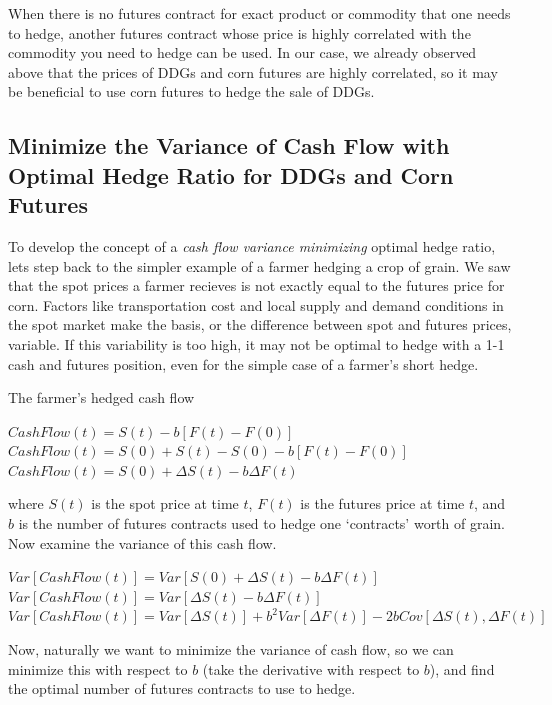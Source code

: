 \documentclass[
]{book}
\begin{document}
When there is no futures contract for exact product or commodity that one needs to hedge, another futures contract whose price is highly correlated with the commodity you need to hedge can be used. In our case, we already observed above that the prices of DDGs and corn futures are highly correlated, so it may be beneficial to use corn futures to hedge the sale of DDGs.

\hypertarget{minimize-the-variance-of-cash-flow-with-optimal-hedge-ratio-for-ddgs-and-corn-futures}{%
\subsection{Minimize the Variance of Cash Flow with Optimal Hedge Ratio for DDGs and Corn Futures}\label{minimize-the-variance-of-cash-flow-with-optimal-hedge-ratio-for-ddgs-and-corn-futures}}

To develop the concept of a \emph{cash flow variance minimizing} optimal hedge ratio, lets step back to the simpler example of a farmer hedging a crop of grain. We saw that the spot prices a farmer recieves is not exactly equal to the futures price for corn. Factors like transportation cost and local supply and demand conditions in the spot market make the basis, or the difference between spot and futures prices, variable. If this variability is too high, it may not be optimal to hedge with a 1-1 cash and futures position, even for the simple case of a farmer's short hedge.

The farmer's hedged cash flow

\(CashFlow(t) = S(t) - b[F(t) - F(0)]\)\\
\(CashFlow(t) = S(0) + S(t) - S(0) - b[F(t) - F(0)]\)\\
\(CashFlow(t) = S(0) + \Delta S(t) - b\Delta F(t)\)

where \(S(t)\) is the spot price at time \(t\), \(F(t)\) is the futures price at time \(t\), and \(b\) is the number of futures contracts used to hedge one `contracts' worth of grain. Now examine the variance of this cash flow.

\(Var[CashFlow(t)] = Var[S(0) + \Delta S(t) - b\Delta F(t)]\)\\
\(Var[CashFlow(t)] = Var[\Delta S(t) - b\Delta F(t)]\)\\
\(Var[CashFlow(t)] = Var[\Delta S(t)] + b^2Var[\Delta F(t)] - 2bCov[\Delta S(t),\Delta F(t)]\)

Now, naturally we want to minimize the variance of cash flow, so we can minimize this with respect to \(b\) (take the derivative with respect to \(b\)), and find the optimal number of futures contracts to use to hedge.
\end{document}
